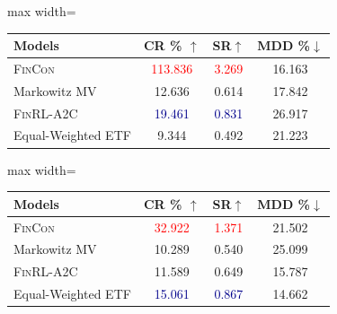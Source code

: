 \begin{figure}[ht]
\centering
\begin{minipage}[b]{0.49\textwidth}
    \centering
    \begin{adjustbox}{max width=\textwidth}
    \begin{tabular}{lccc}
    \toprule
    \textbf{Models} & \textbf{CR \%} $\uparrow$ & \textbf{SR}$\uparrow$  & \textbf{MDD \%}$\downarrow$ \\
    \midrule
    \textsc{FinCon} &   \textcolor{red}{113.836} & \textcolor{red}{3.269}& 16.163 \\
    Markowitz MV  & 12.636 & 0.614 & 17.842 \\
    \textsc{FinRL}-A2C & \textcolor{darkblue}{19.461} & \textcolor{darkblue}{0.831} & 26.917  \\
    Equal-Weighted ETF & 9.344 & 0.492 & 21.223 \\
    \bottomrule
    \end{tabular}
    \end{adjustbox}
\end{minipage}%
\hfill
\begin{minipage}[b]{0.49\textwidth}
    \centering
    \begin{adjustbox}{max width=\textwidth}
    \begin{tabular}{lccc}
    \toprule
    \textbf{Models} & \textbf{CR \%} $\uparrow$ & \textbf{SR}$\uparrow$  & \textbf{MDD \%}$\downarrow$ \\
    \midrule
    \textsc{FinCon} &   \textcolor{red}{32.922} & \textcolor{red}{1.371}& 21.502 \\
    Markowitz MV  & 10.289 & 0.540 & 25.099 \\
    \textsc{FinRL}-A2C & 11.589 & 0.649 & 15.787  \\
    Equal-Weighted ETF & \textcolor{darkblue}{15.061} & \textcolor{darkblue}{0.867} & 14.662 \\
    \bottomrule
    \end{tabular}
    \end{adjustbox}
\end{minipage}
\label{table:trading_comparison}
\end{figure}
